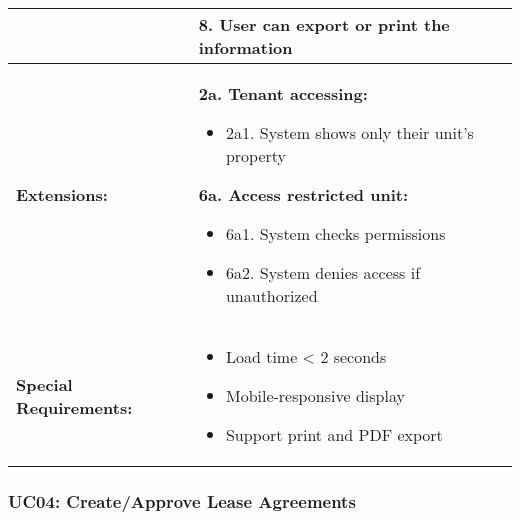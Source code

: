 \documentclass[12pt]{article}
\begin{document}
\begin{tabular}{|p{3cm}|p{11cm}|}
& 8. User can export or print the information \\
\hline
\textbf{Extensions:} & 
\textbf{2a. Tenant accessing:}
\begin{itemize}
    \item 2a1. System shows only their unit's property
\end{itemize}
\textbf{6a. Access restricted unit:}
\begin{itemize}
    \item 6a1. System checks permissions
    \item 6a2. System denies access if unauthorized
\end{itemize} \\
\hline
\textbf{Special Requirements:} & 
\begin{itemize}
    \item Load time < 2 seconds
    \item Mobile-responsive display
    \item Support print and PDF export
\end{itemize} \\
\hline
\end{tabular}

\subsubsection{UC04: Create/Approve Lease Agreements}
\end{document}
